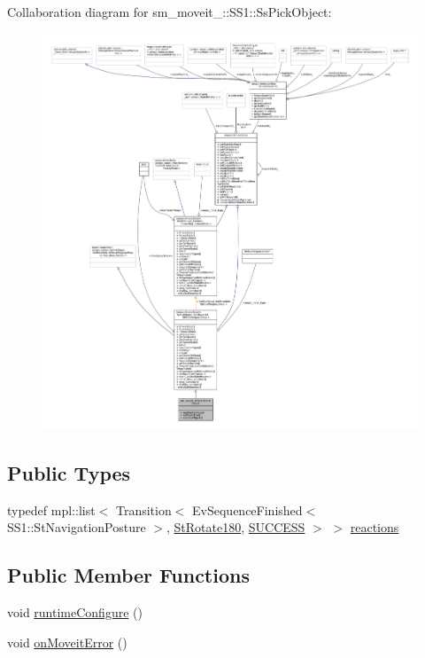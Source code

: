 Collaboration diagram for sm\+\_\+moveit\+\_\+:\+:S\+S1\+:\+:Ss\+Pick\+Object\+:
\nopagebreak
\begin{figure}[H]
\begin{center}
\leavevmode
\includegraphics[width=350pt]{structsm__moveit__4_1_1SS1_1_1SsPickObject__coll__graph}
\end{center}
\end{figure}
\subsection*{Public Types}
\begin{DoxyCompactItemize}
\item 
typedef mpl\+::list$<$ Transition$<$ Ev\+Sequence\+Finished$<$ S\+S1\+::\+St\+Navigation\+Posture $>$, \hyperlink{structsm__moveit__4_1_1StRotate180}{St\+Rotate180}, \hyperlink{classSUCCESS}{S\+U\+C\+C\+E\+SS} $>$ $>$ \hyperlink{structsm__moveit__4_1_1SS1_1_1SsPickObject_a0a2da7472c47d29f6206b1cf6305c00a}{reactions}
\end{DoxyCompactItemize}
\subsection*{Public Member Functions}
\begin{DoxyCompactItemize}
\item 
void \hyperlink{structsm__moveit__4_1_1SS1_1_1SsPickObject_a00ddf11db72eb417a0e4221426722c02}{runtime\+Configure} ()
\item 
void \hyperlink{structsm__moveit__4_1_1SS1_1_1SsPickObject_a93785400a47ee6a1ad38d49b2a7a069b}{on\+Moveit\+Error} ()
\end{DoxyCompactItemize}
